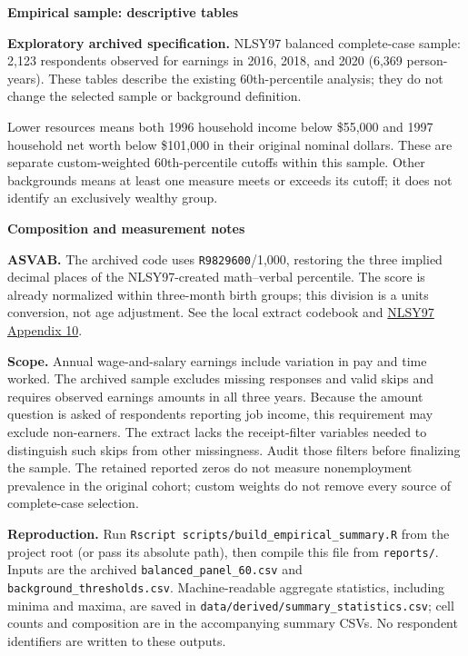 \documentclass[11pt,letterpaper]{article}
\begin{document}
{\Large\bfseries Empirical sample: descriptive tables}\par
\textbf{Exploratory archived specification.} NLSY97 balanced complete-case sample: 2,123 respondents observed for earnings in 2016, 2018, and 2020 (6,369 person-years). These tables describe the existing 60th-percentile analysis; they do not change the selected sample or background definition.\par
Lower resources means both 1996 household income below \$55,000 and 1997 household net worth below \$101,000 in their original nominal dollars. These are separate custom-weighted 60th-percentile cutoffs within this sample. Other backgrounds means at least one measure meets or exceeds its cutoff; it does not identify an exclusively wealthy group.\par

\newpage
{\large\bfseries Composition and measurement notes}\par

\textbf{ASVAB.} The archived code uses \texttt{R9829600}/1,000, restoring the three implied decimal places of the NLSY97-created math--verbal percentile. The score is already normalized within three-month birth groups; this division is a units conversion, not age adjustment. See the local extract codebook and \href{https://nlsinfo.org/content/cohorts/nlsy97/other-documentation/codebook-supplement/appendix-10-cat-asvab-scores}{NLSY97 Appendix 10}.\par
\textbf{Scope.} Annual wage-and-salary earnings include variation in pay and time worked. The archived sample excludes missing responses and valid skips and requires observed earnings amounts in all three years. Because the amount question is asked of respondents reporting job income, this requirement may exclude non-earners. The extract lacks the receipt-filter variables needed to distinguish such skips from other missingness. Audit those filters before finalizing the sample. The retained reported zeros do not measure nonemployment prevalence in the original cohort; custom weights do not remove every source of complete-case selection.\par
\textbf{Reproduction.} Run \texttt{Rscript scripts/build\_empirical\_summary.R} from the project root (or pass its absolute path), then compile this file from \texttt{reports/}. Inputs are the archived \texttt{balanced\_panel\_60.csv} and \texttt{background\_thresholds.csv}. Machine-readable aggregate statistics, including minima and maxima, are saved in \texttt{data/derived/summary\_statistics.csv}; cell counts and composition are in the accompanying summary CSVs. No respondent identifiers are written to these outputs.
\end{document}

